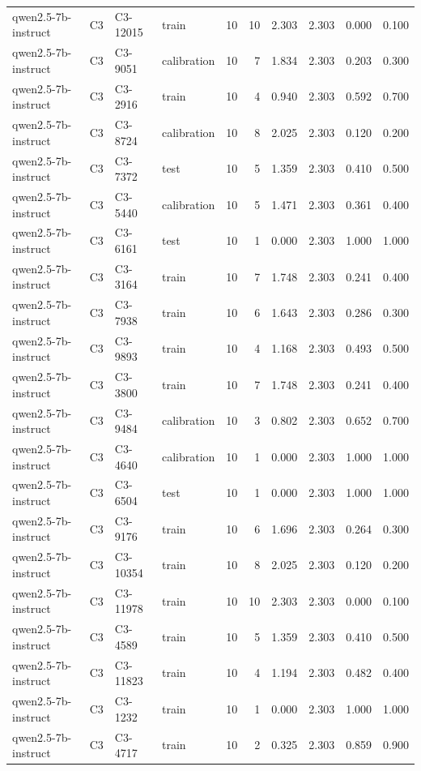 \begin{table}
\begin{tabular}{llllrrrrrr}
qwen2.5-7b-instruct & C3 & C3-12015 & train & 10 & 10 & 2.303 & 2.303 & 0.000 & 0.100 \\
qwen2.5-7b-instruct & C3 & C3-9051 & calibration & 10 & 7 & 1.834 & 2.303 & 0.203 & 0.300 \\
qwen2.5-7b-instruct & C3 & C3-2916 & train & 10 & 4 & 0.940 & 2.303 & 0.592 & 0.700 \\
qwen2.5-7b-instruct & C3 & C3-8724 & calibration & 10 & 8 & 2.025 & 2.303 & 0.120 & 0.200 \\
qwen2.5-7b-instruct & C3 & C3-7372 & test & 10 & 5 & 1.359 & 2.303 & 0.410 & 0.500 \\
qwen2.5-7b-instruct & C3 & C3-5440 & calibration & 10 & 5 & 1.471 & 2.303 & 0.361 & 0.400 \\
qwen2.5-7b-instruct & C3 & C3-6161 & test & 10 & 1 & 0.000 & 2.303 & 1.000 & 1.000 \\
qwen2.5-7b-instruct & C3 & C3-3164 & train & 10 & 7 & 1.748 & 2.303 & 0.241 & 0.400 \\
qwen2.5-7b-instruct & C3 & C3-7938 & train & 10 & 6 & 1.643 & 2.303 & 0.286 & 0.300 \\
qwen2.5-7b-instruct & C3 & C3-9893 & train & 10 & 4 & 1.168 & 2.303 & 0.493 & 0.500 \\
qwen2.5-7b-instruct & C3 & C3-3800 & train & 10 & 7 & 1.748 & 2.303 & 0.241 & 0.400 \\
qwen2.5-7b-instruct & C3 & C3-9484 & calibration & 10 & 3 & 0.802 & 2.303 & 0.652 & 0.700 \\
qwen2.5-7b-instruct & C3 & C3-4640 & calibration & 10 & 1 & 0.000 & 2.303 & 1.000 & 1.000 \\
qwen2.5-7b-instruct & C3 & C3-6504 & test & 10 & 1 & 0.000 & 2.303 & 1.000 & 1.000 \\
qwen2.5-7b-instruct & C3 & C3-9176 & train & 10 & 6 & 1.696 & 2.303 & 0.264 & 0.300 \\
qwen2.5-7b-instruct & C3 & C3-10354 & train & 10 & 8 & 2.025 & 2.303 & 0.120 & 0.200 \\
qwen2.5-7b-instruct & C3 & C3-11978 & train & 10 & 10 & 2.303 & 2.303 & 0.000 & 0.100 \\
qwen2.5-7b-instruct & C3 & C3-4589 & train & 10 & 5 & 1.359 & 2.303 & 0.410 & 0.500 \\
qwen2.5-7b-instruct & C3 & C3-11823 & train & 10 & 4 & 1.194 & 2.303 & 0.482 & 0.400 \\
qwen2.5-7b-instruct & C3 & C3-1232 & train & 10 & 1 & 0.000 & 2.303 & 1.000 & 1.000 \\
qwen2.5-7b-instruct & C3 & C3-4717 & train & 10 & 2 & 0.325 & 2.303 & 0.859 & 0.900 \\

\end{tabular}
\end{table}
